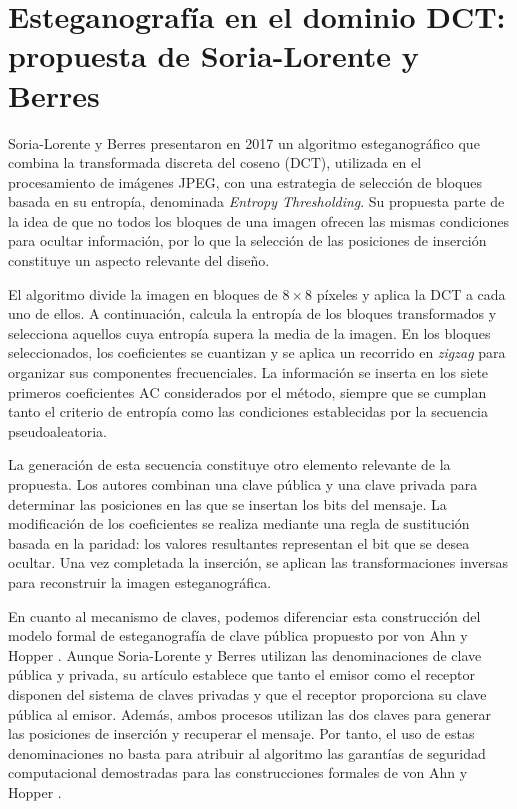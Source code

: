 \documentclass[IB]{TFUOC}%
\begin{document}
\section{Esteganografía en el dominio DCT: propuesta de Soria-Lorente y Berres}

Soria-Lorente y Berres \cite{13} presentaron en 2017 un algoritmo esteganográfico que combina la transformada discreta del coseno ($\mathrm{DCT}$), utilizada en el procesamiento de imágenes JPEG, con una estrategia de selección de bloques basada en su entropía, denominada \textit{Entropy Thresholding}. Su propuesta parte de la idea de que no todos los bloques de una imagen ofrecen las mismas condiciones para ocultar información, por lo que la selección de las posiciones de inserción constituye un aspecto relevante del diseño.

El algoritmo divide la imagen en bloques de $8 \times 8$ píxeles y aplica la DCT a cada uno de ellos. A continuación, calcula la entropía de los bloques transformados y selecciona aquellos cuya entropía supera la media de la imagen. En los bloques seleccionados, los coeficientes se cuantizan y se aplica un recorrido en \textit{zigzag} para organizar sus componentes frecuenciales. La información se inserta en los siete primeros coeficientes $\mathrm{AC}$ considerados por el método, siempre que se cumplan tanto el criterio de entropía como las condiciones establecidas por la secuencia pseudoaleatoria.

La generación de esta secuencia constituye otro elemento relevante de la propuesta. Los autores combinan una clave pública y una clave privada para determinar las posiciones en las que se insertan los bits del mensaje. La modificación de los coeficientes se realiza mediante una regla de sustitución basada en la paridad: los valores resultantes representan el bit que se desea ocultar. Una vez completada la inserción, se aplican las transformaciones inversas para reconstruir la imagen esteganográfica.

En cuanto al mecanismo de claves, podemos diferenciar esta construcción del modelo formal de esteganografía de clave pública propuesto por von Ahn y Hopper \cite{4}. Aunque Soria-Lorente y Berres utilizan las denominaciones de clave pública y privada, su artículo establece que tanto el emisor como el receptor disponen del sistema de claves privadas y que el receptor proporciona su clave pública al emisor. Además, ambos procesos utilizan las dos claves para generar las posiciones de inserción y recuperar el mensaje. Por tanto, el uso de estas denominaciones no basta para atribuir al algoritmo las garantías de seguridad computacional demostradas para las construcciones formales de von Ahn y Hopper \cite{4}.
\end{document}
